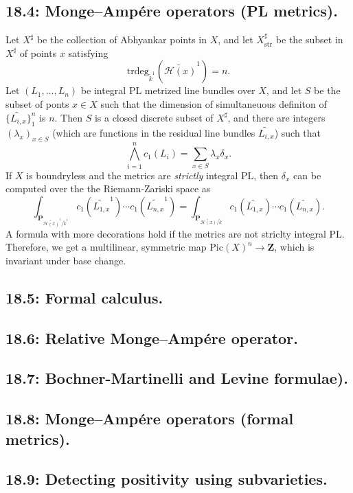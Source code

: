 \documentclass[12pt,reqno]{amsart}
\theoremstyle{definition}
\theoremstyle{remark}
\theoremstyle{citedrem}
\theoremstyle{cited}
\theoremstyle{citeddef}
\theoremstyle{step}
\begin{document}
\subsection*{18.4: Monge--Amp\'{e}re operators (PL metrics). }Let $X^\sharp$ be the collection of Abhyankar points in $X$, and let $X^\sharp_{\mathrm{str}}$ be the subset in $X^\sharp$ of points $x$ satisfying \[\mathrm{trdeg}_{\tilde{k}^1}(\widetilde{\mathcal{H}(x)}^1) = n.\] Let $(L_1, \ldots, L_n)$ be integral PL metrized line bundles over $X$, and let $S$ be the subset of ponts $x \in X$ such that the dimension of simultaneuous definiton of $\{\widetilde{L_{i,x}}\}_1^n$ is $n$. Then $S$ is a closed discrete subset of $X^\sharp$, and there are integers $(\lambda_x)_{x \in S}$ (which are functions in the residual line bundles $\widetilde{L_{i,x}}$) such that 
\[\bigwedge_{i=1}^n c_1(L_i) = \sum_{x \in S} \lambda_x \delta_x.\]
If $X$ is boundryless and the metrics are \emph{strictly} integral PL, then $\delta_x$ can be computed over the the Riemann-Zariski space as
\[\int_{\mathbf{P}_{\widetilde{\mathcal{H}(x)}^1 / \tilde{k}^1}} c_1(\widetilde{L_{1,x}}^1) \cdots c_1(\widetilde{L_{n,x}}^1) = \int_{\mathbf{P}_{\widetilde{\mathcal{H}(x)} / \tilde{k}}} c_1(\widetilde{L_{1,x}}) \cdots c_1(\widetilde{L_{n,x}}).\] A formula with more decorations hold if the metrics are not striclty integral PL. Therefore, we get a multilinear, symmetric map $\mathrm{Pic}(X)^n \to \mathbf{Z}$, which is invariant under base change. 

\subsection*{18.5: Formal calculus. }

\subsection*{18.6: Relative Monge--Amp\'{e}re operator. }

\subsection*{18.7: Bochner-Martinelli and Levine formulae). }

\subsection*{18.8: Monge--Amp\'{e}re operators (formal metrics). }

\subsection*{18.9: Detecting positivity using subvarieties. }



\end{document}
